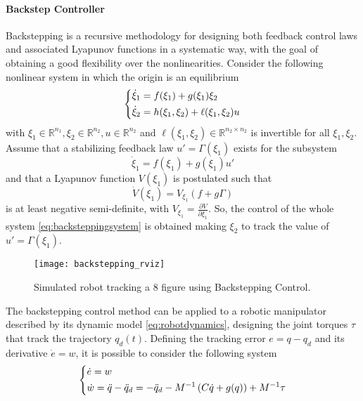 \paragraph{Backstep Controller}
Backstepping is a recursive methodology for designing both feedback control laws and associated Lyapunov functions in a systematic way, with the goal of obtaining a good flexibility over the nonlinearities. Consider the following nonlinear system in which the origin is an equilibrium
\begin{equation}
\begin{dcases}
\dot{\xi}_1 = f(\xi_1) + g(\xi_1)\xi_2 \\
\dot{\xi}_2 = h(\xi_1,\xi_2) + \ell(\xi_1,\xi_2)u
\end{dcases}
\label{eq:backsteppingsystem}
\end{equation}
with $\xi_1\in\mathbb{R}^{n_1}, \xi_2\in\mathbb{R}^{n_2},u\in\mathbb{R}^{n_2}$ and $\ell(\xi_1,\xi_2)\in\mathbb{R}^{n_2 \times n_2}$ is invertible for all $\xi_1,\xi_2$. Assume that a stabilizing feedback law $u'=\Gamma(\xi_1)$ exists for the subsystem 
\begin{equation}
\dot{\xi}_1 = f(\xi_1) + g(\xi_1)u'
\end{equation}
and that a Lyapunov function $V(\xi_1)$ is postulated such that
\begin{equation}
\dot{V}(\xi_1) = V_{\xi_1}(f + g\Gamma)
\end{equation}
is at least negative semi-definite, with $V_{\xi_1} = \frac{\partial{V}}{\partial{\xi_1}}$. So, the control of the whole system \eqref{eq:backsteppingsystem} is obtained making $\xi_2$ to track the value of $u'=\Gamma(\xi_1)$.
\begin{figure}[H]
	\centering
	\texttt{[image: backstepping\_rviz]}
	\caption{Simulated robot tracking a 8 figure using Backstepping Control.}
\end{figure}
The backstepping control method can be applied to a robotic manipulator described by its dynamic model \eqref{eq:robotdynamics}, designing the joint torques $\tau$ that track the trajectory $q_d(t)$. Defining the tracking error $e=q-q_d$ and its derivative $\dot{e}=w$, it is possible to consider the following system
\begin{equation}
\begin{dcases}
\dot{e} = w\\
\dot{w} = \ddot{q}-\ddot{q}_d = -\ddot{q}_d - M^{-1}\left(C\dot{q}+g(q)\right) + M^{-1}\tau
\end{dcases}
\label{eq:lagrangianbackstepping}
\end{equation}
